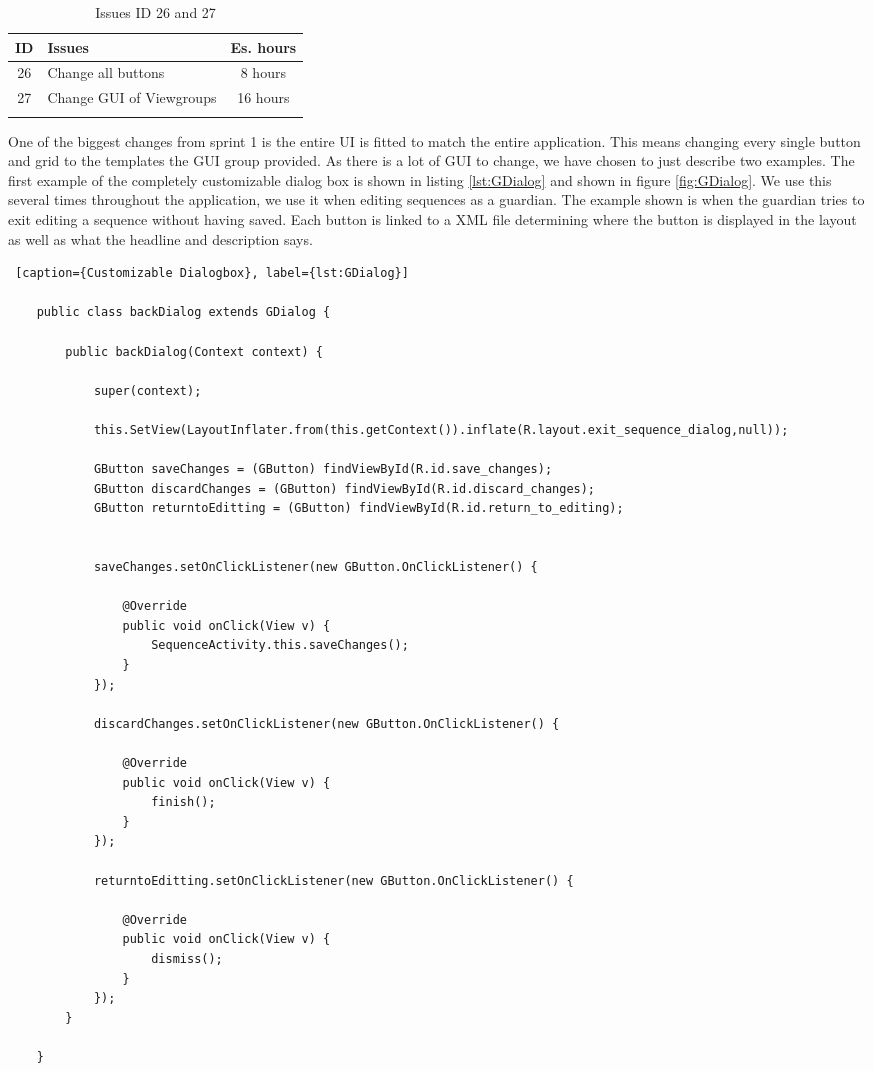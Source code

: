 
\begin{longtable} { | c | p{12cm} | c | } 
\hline
	ID 	&	Issues	&		 Es. hours \\\hline
	26	& 	Change all buttons	&	8 hours	\\\hline
	27	& 	Change GUI of Viewgroups	&	16 hours	\\\hline
\caption{Issues ID 26 and 27}
\label{tab:spr2_GUIchange}
\end{longtable}

One of the biggest changes from sprint 1 is the entire UI is fitted to match the entire application. This means changing every single button and grid to the templates the GUI group provided. As there is a lot of GUI to change, we have chosen to just describe two examples. The first example of the completely customizable dialog box is shown in listing \ref{lst:GDialog} and shown in figure \ref{fig:GDialog}. We use this several times throughout the application, we use it when editing sequences as a guardian. The example shown is when the guardian tries to exit editing a sequence without having saved. Each button is linked to a XML file determining where the button is displayed in the layout as well as what the headline and description says.

\begin{lstlisting} [caption={Customizable Dialogbox}, label={lst:GDialog}]

    public class backDialog extends GDialog {

        public backDialog(Context context) {

            super(context);

            this.SetView(LayoutInflater.from(this.getContext()).inflate(R.layout.exit_sequence_dialog,null));

            GButton saveChanges = (GButton) findViewById(R.id.save_changes);
            GButton discardChanges = (GButton) findViewById(R.id.discard_changes);
            GButton returntoEditting = (GButton) findViewById(R.id.return_to_editing);


            saveChanges.setOnClickListener(new GButton.OnClickListener() {

                @Override
                public void onClick(View v) {
                    SequenceActivity.this.saveChanges();
                }
            });

            discardChanges.setOnClickListener(new GButton.OnClickListener() {

                @Override
                public void onClick(View v) {
                    finish();
                }
            });

            returntoEditting.setOnClickListener(new GButton.OnClickListener() {

                @Override
                public void onClick(View v) {
                    dismiss();
                }
            });
        }

    }
\end{lstlisting}


